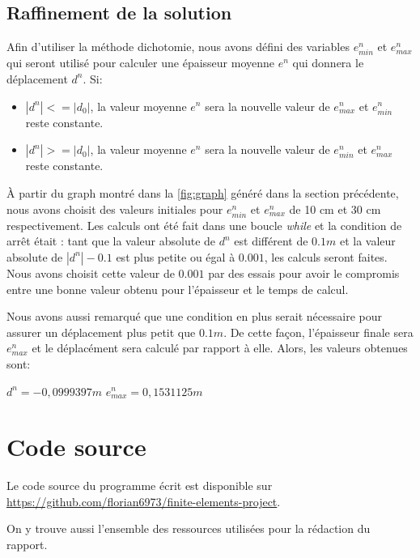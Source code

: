 \documentclass{article}
\begin{document}
    \subsection{Raffinement de la solution}
    
    Afin d'utiliser la méthode dichotomie, nous avons défini des variables $e^n_{min}$ et $e^n_{max}$  qui seront utilisé pour calculer une épaisseur moyenne $e^n$ 	qui donnera le déplacement $d^n$. Si:
    
    \begin{itemize}
    \item $|d^n| <= |d_0|$, la valeur moyenne $e^n$ sera la nouvelle valeur de $e^n_{max}$ et $e^n_{min}$ reste constante.
    \item $|d^n| >= |d_0|$, la valeur moyenne $e^n$ sera la nouvelle valeur de $e^n_{min}$ et $e^n_{max}$ reste constante.
    \end{itemize}
   
   À partir du graph montré dans la \ref{fig:graph} généré dans la section précédente, nous avons choisit des valeurs initiales pour $e^n_{min}$ et $e^n_{max}$ de 10 cm et 30 cm respectivement. Les calculs ont été fait dans une boucle \emph {while} et la condition de arrêt était : tant que la valeur absolute de $d^n$ est différent de $0.1 m$ et la valeur absolute de $|d^n|-0.1$ est plus petite ou égal à $0.001$, les calculs seront faites. Nous avons choisit cette valeur de $0.001$ par des essais pour avoir le compromis entre une bonne valeur obtenu pour l'épaisseur et le temps de calcul.
    
    Nous avons aussi remarqué que une condition en plus serait nécessaire pour assurer un déplacement plus petit que $ 0.1 m$. De cette façon, l'épaisseur finale sera $e^n_{max}$ et le déplacément sera calculé par rapport à elle. Alors, les valeurs obtenues sont:

    \begin{center}
    $d^n = - 0,0999397 m$
    $e^n_{max} = 0,1531125 m$
    \end{center}
    
    \clearpage
    \appendix
    \section {Code source}

    Le code source du programme écrit est disponible sur \url{https://github.com/florian6973/finite-elements-project}.

    On y trouve aussi l'ensemble des ressources utilisées pour la rédaction du rapport.



    
\end{document}
